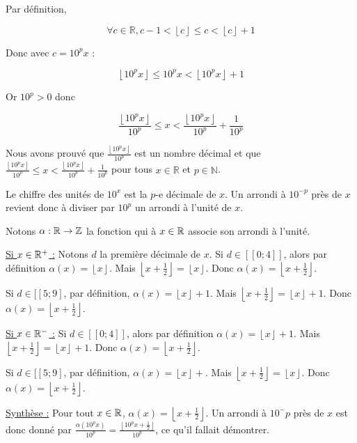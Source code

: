 \documentclass[]{../templates/homework}
\providecommand{\floor}[1]{\left \lfloor #1 \right \rfloor }
\begin{document}
Par définition,

\begin{equation*}
\forall c \in \mathbb{R}, c-1 < \floor{c} \leqslant c < \floor{c} + 1
\end{equation*}

Donc avec $c = 10^px$ :

\begin{equation*}
	\floor{10^px} \leqslant 10^px < \floor{10^px} + 1
\end{equation*}

Or $10^p > 0$ donc

\begin{equation*}
	\frac{\floor{10^px}}{10^p} \leqslant x < \frac{\floor{10^px}}{10^p} + \frac{1}{10^p}
\end{equation*}

Nous avons prouvé que $\frac{\floor{10^px}}{10^p}$ est un nombre décimal et que $\frac{\floor{10^px}}{10^p} \leqslant x < \frac{\floor{10^px}}{10^p} + \frac{1}{10^p}$ pour tous $x \in \mathbb{R}$ et $p \in \mathbb{N}$.

\question
Le chiffre des unités de $10^x$ est la $p$-e décimale de $x$. Un arrondi à $10^{-p}$ près de $x$ revient donc à diviser par $10^p$ un arrondi à l'unité de $x$.

Notons $\alpha: \mathbb R \rightarrow \mathbb Z$ la fonction qui à $x \in \mathbb R$ associe son arrondi à l'unité.

\underline{Si $x\in\mathbb R^+$ :} Notons $d$ la première décimale de $x$. Si $d\in [\![0;4]\!]$, alors par définition $\alpha(x) = \floor{x}$. Mais $\floor{x + \frac 1 2} = \floor{x}$. Donc $\alpha(x) = \floor{x + \frac 1 2}$.

Si $d\in [\![5;9]\!$, par définition, $\alpha(x) = \floor x + 1$. Mais $\floor{x + \frac 1 2} = \floor{x} +1$. Donc $\alpha(x) = \floor{x + \frac 1 2}$.

\underline{Si $x\in\mathbb R^-$ :} Si $d\in [\![0;4]\!]$, alors par définition $\alpha(x) = \floor{x}+1$. Mais $\floor{x + \frac 1 2} = \floor{x}+1$. Donc $\alpha(x) = \floor{x + \frac 1 2}$.

Si $d\in [\![5;9]\!$, par définition, $\alpha(x) = \floor x +$. Mais $\floor{x + \frac 1 2} = \floor{x}$. Donc $\alpha(x) = \floor{x + \frac 1 2}$.

\underline{Synthèse :} Pour tout $x \in \mathbb R$, $\alpha(x) = \floor {x + \frac 1 2}$. Un arrondi à $10^-p$ près de $x$ est donc donné par $\frac {\alpha(10^px)}{10^p} = \frac {\floor {10^px + \frac 1 2}}{10^p}$, ce qu'il fallait démontrer.
\end{document}
